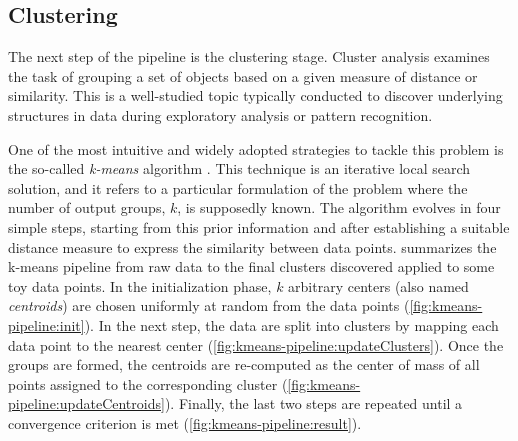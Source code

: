 \subsection{Clustering} \label{sec:clustering}

The next step of the pipeline is the clustering stage.
Cluster analysis examines the task of grouping a set of objects based on a given measure of distance or similarity.
This is a well-studied topic typically conducted to discover underlying structures in data during exploratory analysis or pattern recognition.

One of the most intuitive and widely adopted strategies to tackle this problem is the so-called \textit{k-means} algorithm \cite{lloyd1982kmeans}.
This technique is an iterative local search solution, and it refers to a particular formulation of the problem where the number of output groups, $k$, is supposedly known.
The algorithm evolves in four simple steps, starting from this prior information and after establishing a suitable distance measure to express the similarity between data points.
 summarizes the k-means pipeline from raw data to the final clusters discovered applied to some toy data points.
In the initialization phase, $k$ arbitrary centers (also named \textit{centroids}) are chosen uniformly at random from the data points (\cref{fig:kmeans-pipeline:init}). 
In the next step, the data are split into clusters by mapping each data point to the nearest center (\cref{fig:kmeans-pipeline:updateClusters}). 
Once the groups are formed, the centroids are re-computed as the center of mass of all points assigned to the corresponding cluster (\cref{fig:kmeans-pipeline:updateCentroids}).
Finally, the last two steps are repeated until a convergence criterion is met (\cref{fig:kmeans-pipeline:result}).

    

